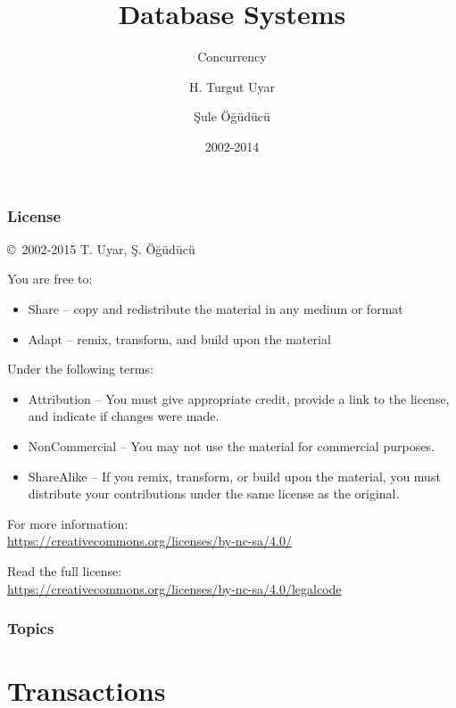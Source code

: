 \documentclass[dvipsnames]{beamer}
\title{Database Systems}
\subtitle{Concurrency}
\author{H. Turgut Uyar \and Şule Öğüdücü}
\date{2002-2014}
\theoremstyle{plain}
\begin{document}
\begin{frame}
  \titlepage
\end{frame}

\begin{frame}
  \frametitle{License}

  \hfill
  \copyright~2002-2015 T. Uyar, Ş. Öğüdücü

  \vfill
  \begin{footnotesize}
    You are free to:
    \begin{itemize}
      \itemsep0em
      \item Share -- copy and redistribute the material in any medium or format
      \item Adapt -- remix, transform, and build upon the material
    \end{itemize}

    Under the following terms:
    \begin{itemize}
      \itemsep0em
      \item Attribution -- You must give appropriate credit, provide a link to
        the license, and indicate if changes were made.

      \item NonCommercial -- You may not use the material for commercial
        purposes.

      \item ShareAlike -- If you remix, transform, or build upon the material,
        you must distribute your contributions under the same license as the
        original.
    \end{itemize}
  \end{footnotesize}

  \begin{small}
    For more information:\\
    \url{https://creativecommons.org/licenses/by-nc-sa/4.0/}

    \smallskip
    Read the full license:\\
    \url{https://creativecommons.org/licenses/by-nc-sa/4.0/legalcode}
  \end{small}
\end{frame}

\begin{frame}
  \frametitle{Topics}
  \tableofcontents
\end{frame}

\section{Transactions}
\end{document}
